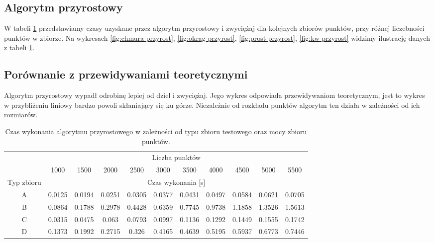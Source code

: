 \documentclass[11pt]{article}
\theoremstyle{remark} \newtheorem{definition}{def.}
\theoremstyle{definition} \newtheorem{twierdzenie}{tw.}
\begin{document}
\subsection{Algorytm przyrostowy}


W tabeli \ref{tab:przyrost} przedstawiamy czasy uzyskane przez algorytm przyrostowy i zwyciężaj dla kolejnych zbiorów punktów, przy różnej liczebności punktów w zbiorze. Na wykresach \ref{fig:chmura-przyrost}, 
\ref{fig:okrag-przyrost}, \ref{fig:prost-przyrost}, \ref{fig:kw-przyrost} widzimy ilustrację danych z tabeli \ref{tab:przyrost}.

\subsection{Porównanie z przewidywaniami teoretycznymi}
Algorytm przyrostowy wypadł odrobinę lepiej od dziel i zwyciężaj. Jego wykres odpowiada przewidywaniom teoretycznym,
jest to wykres w przybliżeniu liniowy bardzo powoli skłaniający się ku górze. Niezależnie od rozkładu punktów algorytm
ten działa w zależności od ich rozmiarów.

\begin{table}[]
\centering
\caption{Czas wykonania algorytmu przyrostowego w zależności od typu zbioru testowego oraz mocy zbioru punktów.}
\label{tab:przyrost}
\begin{tabular}{c|c|c|c|c|c|c|c|c|c|c|}
\cline{2-11}
\multicolumn{1}{l|}{} & \multicolumn{10}{c|}{Liczba punktów} \\ \cline{2-11} 
\multicolumn{1}{l|}{} & 1000 & 1500 & 2000 & 2500 & 3000 & 3500 & 4000 & 4500 & 5000 & 5500 \\ \hline
\multicolumn{1}{|c|}{Typ zbioru} & \multicolumn{10}{c|}{Czas wykonania {[}s{]}} \\ \hline
\multicolumn{1}{|c|}{A} & 0.0125 & 0.0194 & 0.0251 & 0.0305 & 0.0377 & 0.0431 & 0.0497 & 0.0584 & 0.0621 & 0.0705 \\ \hline
\multicolumn{1}{|c|}{B} & 0.0864 & 0.1788 & 0.2978 & 0.4428 & 0.6359 & 0.7745 & 0.9738 & 1.1858 & 1.3526 & 1.5613 \\ \hline
\multicolumn{1}{|c|}{C} & 0.0315 & 0.0475 & 0.063 & 0.0793 & 0.0997 & 0.1136 & 0.1292 & 0.1449 & 0.1555 & 0.1742 \\ \hline
\multicolumn{1}{|c|}{D} & 0.1373 & 0.1992 & 0.2715 & 0.326 & 0.4165 & 0.4639 & 0.5195 & 0.5937 & 0.6773 & 0.7446 \\ \hline
\end{tabular}
\end{table}
\end{document}
